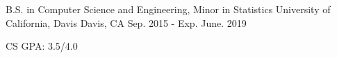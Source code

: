 

\begin{cventries}

  \cventry
    {B.S. in Computer Science and Engineering, Minor in Statistics} %
    {University of California, Davis} %
    {Davis, CA} %
    {Sep. 2015 - Exp. June. 2019} %
    {
      \begin{cvitems} %
        \item {CS GPA: 3.5/4.0}
      \end{cvitems}
    }

\end{cventries}
